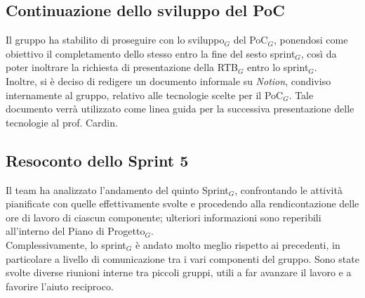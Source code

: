 \documentclass[a4paper, 10pt, colorlinks=true, linkcolor=black, urlcolor=blue, citecolor=blue, hidelinks]{article}
\begin{document}
\subsection{Continuazione dello sviluppo del PoC}
Il gruppo ha stabilito di proseguire con lo sviluppo$_G$ del PoC$_G$, ponendosi come obiettivo il completamento dello stesso entro la fine del sesto sprint$_G$, così da poter inoltrare la richiesta di presentazione della RTB$_G$ entro lo sprint$_G$.\\
Inoltre, si è deciso di redigere un documento informale su \textit{Notion}, condiviso internamente al gruppo, relativo alle tecnologie scelte per il PoC$_G$. Tale documento verrà utilizzato come linea guida per la successiva presentazione delle tecnologie al prof. Cardin.

\subsection{Resoconto dello Sprint 5}
Il team ha analizzato l'andamento del quinto Sprint$_G$, confrontando le attività pianificate con quelle effettivamente svolte e procedendo alla rendicontazione delle ore di lavoro di ciascun componente; ulteriori informazioni sono reperibili all'interno del Piano di Progetto$_G$.\\
Complessivamente, lo sprint$_G$ è andato molto meglio rispetto ai precedenti, in particolare a livello di comunicazione tra i vari componenti del gruppo. Sono state svolte diverse riunioni interne tra piccoli gruppi, utili a far avanzare il lavoro e a favorire l'aiuto reciproco.
\end{document}
